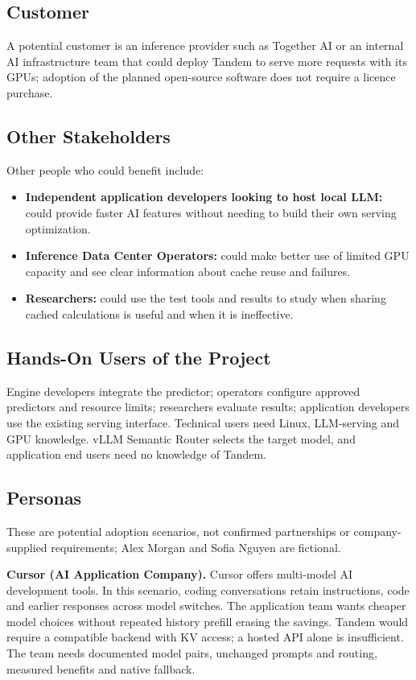 \documentclass[12pt]{article}
\begin{document}
\subsection{Customer}
A potential customer is an inference provider such as
Together AI or an internal AI infrastructure
team that could deploy Tandem to serve more requests with its GPUs; adoption
of the planned open-source software does not require a licence purchase.


\subsection{Other Stakeholders}
Other people who could benefit include:
\begin{itemize}
\item \textbf{Independent application developers looking to host local LLM:} could provide faster
AI features without needing to build their own serving optimization.
\item \textbf{Inference Data Center Operators:} could make better use of limited GPU capacity
and see clear information about cache reuse and failures.
\item \textbf{Researchers:} could use the test tools and results to study
when sharing cached calculations is useful and when it is ineffective.
\end{itemize}

\subsection{Hands-On Users of the Project}
Engine developers integrate the predictor; operators configure approved
predictors and resource limits; researchers evaluate results; application
developers use the existing serving interface. Technical users need Linux,
LLM-serving and GPU knowledge. vLLM Semantic Router selects the target model,
and application end users need no knowledge of Tandem.


\subsection{Personas}
These are potential adoption scenarios, not confirmed partnerships or
company-supplied requirements; Alex Morgan and Sofia Nguyen are fictional.

\par\medskip\noindent{}\label{persona:cursor}
\textbf{Cursor (AI Application Company).}
Cursor offers multi-model AI development tools.
In this scenario, coding conversations retain instructions, code and earlier
responses across model switches. The application team wants cheaper model
choices without repeated history prefill erasing the savings. Tandem would
require a compatible backend with KV access; a hosted API alone is insufficient.
The team needs documented model pairs, unchanged prompts and routing,
measured benefits and native fallback.
\end{document}
